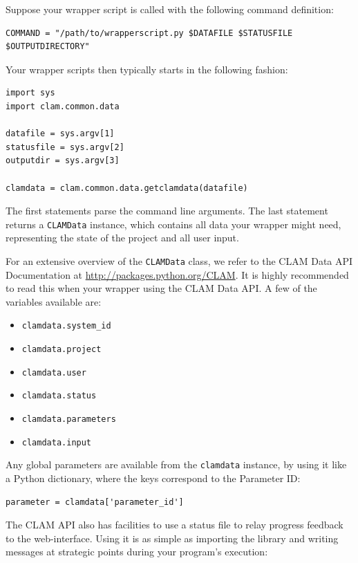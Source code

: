 \documentclass[a4paper,12pt]{report}
\begin{document}
Suppose your wrapper script is called with the following command definition:

\begin{verbatim}
COMMAND = "/path/to/wrapperscript.py $DATAFILE $STATUSFILE $OUTPUTDIRECTORY" 
\end{verbatim}


Your wrapper scripts then typically starts in the following fashion:


\begin{verbatim}
import sys
import clam.common.data

datafile = sys.argv[1]
statusfile = sys.argv[2]
outputdir = sys.argv[3]

clamdata = clam.common.data.getclamdata(datafile)
\end{verbatim}

The first statements parse the command line arguments. The last statement
returns a \texttt{CLAMData} instance, which contains all data your wrapper might need,
representing the state of the project and all user input.

For an extensive overview of the \texttt{CLAMData} class, we refer to the CLAM
Data API Documentation at \url{http://packages.python.org/CLAM}. It is highly
recommended to read this when your wrapper using the CLAM Data API. A few of the
variables available are:

\begin{itemize}
\item \texttt{clamdata.system\_id}
\item \texttt{clamdata.project}
\item \texttt{clamdata.user}
\item \texttt{clamdata.status}
\item \texttt{clamdata.parameters}
\item \texttt{clamdata.input}
\end{itemize}


Any global parameters are available from the \texttt{clamdata} instance, by
using it like a Python dictionary, where the keys correspond to the Parameter ID:

\begin{verbatim}
parameter = clamdata['parameter_id']
\end{verbatim}

The CLAM API also has facilities to use a status file to relay progress
feedback to the web-interface. Using it is as simple as importing the library
and writing messages at strategic points during your program's execution:
\end{document}
